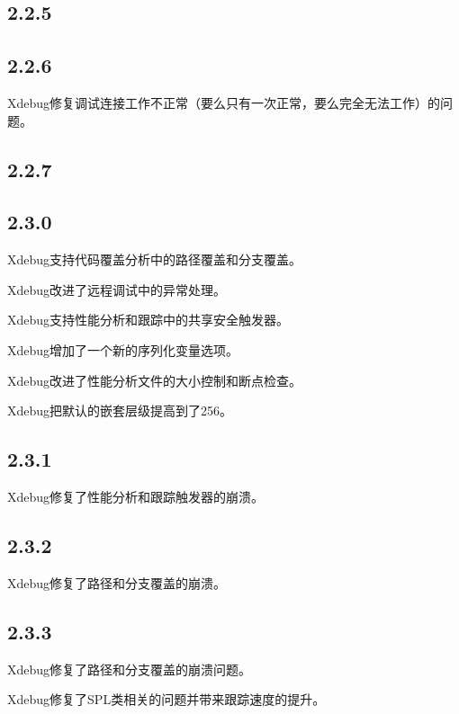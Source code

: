 \subsection{2.2.5}


\subsection{2.2.6}


Xdebug修复调试连接工作不正常（要么只有一次正常，要么完全无法工作）的问题。

\subsection{2.2.7}


\subsection{2.3.0}


\begin{compactitem}
\item Xdebug支持代码覆盖分析中的路径覆盖和分支覆盖。
\item Xdebug改进了远程调试中的异常处理。
\item Xdebug支持性能分析和跟踪中的共享安全触发器。
\item Xdebug增加了一个新的序列化变量选项。
\item Xdebug改进了性能分析文件的大小控制和断点检查。
\end{compactitem}

Xdebug把默认的嵌套层级提高到了256。

\subsection{2.3.1}


Xdebug修复了性能分析和跟踪触发器的崩溃。


\subsection{2.3.2}

Xdebug修复了路径和分支覆盖的崩溃。

\subsection{2.3.3}



\begin{compactitem}
\item Xdebug修复了路径和分支覆盖的崩溃问题。
\item Xdebug修复了SPL类相关的问题并带来跟踪速度的提升。
\end{compactitem}

